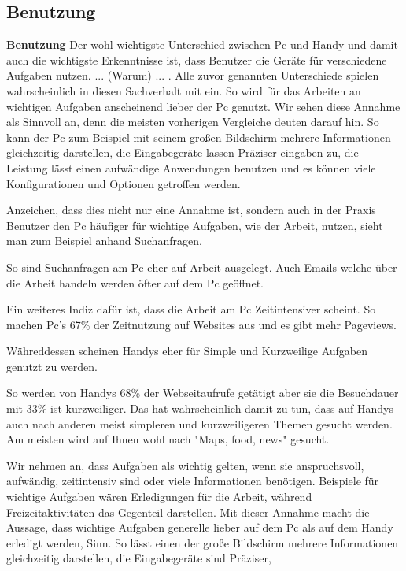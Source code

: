 \subsection{Benutzung}

\myNewSection
\textbf{Benutzung} Der wohl wichtigste Unterschied zwischen Pc und Handy und damit auch die wichtigste Erkenntnisse ist, dass Benutzer die Geräte für verschiedene Aufgaben nutzen. ... (Warum) ... . Alle zuvor genannten Unterschiede spielen wahrscheinlich in diesen Sachverhalt mit ein.%
So wird für das Arbeiten an wichtigen Aufgaben anscheinend lieber der Pc genutzt\cite{pcVsphone_easyUseVsImportantTask}. Wir sehen diese Annahme als Sinnvoll an, denn die meisten vorherigen Vergleiche deuten darauf hin. So kann der Pc zum Beispiel mit seinem großen Bildschirm mehrere Informationen gleichzeitig darstellen, die Eingabegeräte lassen Präziser eingaben zu, die Leistung lässt einen aufwändige Anwendungen benutzen und es können viele Konfigurationen und Optionen getroffen werden. \newline%

Anzeichen, dass dies nicht nur eine Annahme ist, sondern auch in der Praxis Benutzer den Pc häufiger für wichtige Aufgaben, wie der Arbeit, nutzen, sieht man zum Beispiel anhand Suchanfragen. \newline

So sind Suchanfragen am Pc eher auf Arbeit ausgelegt\cite{}. Auch Emails welche über die Arbeit handeln werden öfter auf dem Pc geöffnet\cite{}.

Ein weiteres Indiz dafür ist, dass die Arbeit am Pc Zeitintensiver scheint. So machen Pc's 67\% der Zeitnutzung auf Websites aus und es gibt mehr Pageviews.\newline

Währeddessen scheinen Handys eher für Simple und Kurzweilige Aufgaben genutzt zu werden.

So werden von Handys 68\% der Webseitaufrufe getätigt aber sie die Besuchdauer mit 33\% ist kurzweiliger\cite{}. Das hat wahrscheinlich damit zu tun, dass auf Handys auch nach anderen meist simpleren und kurzweiligeren Themen gesucht werden. Am meisten wird auf Ihnen wohl nach "Maps, food, news" gesucht.  









Wir nehmen an, dass Aufgaben als wichtig gelten, wenn sie anspruchsvoll, aufwändig, zeitintensiv sind oder viele Informationen benötigen. Beispiele für wichtige Aufgaben wären Erledigungen für die Arbeit, während Freizeitaktivitäten das Gegenteil darstellen.\newline%
Mit dieser Annahme macht die Aussage, dass wichtige Aufgaben generelle lieber auf dem Pc als auf dem Handy erledigt werden, Sinn. So lässt einen der große Bildschirm mehrere Informationen gleichzeitig darstellen, die Eingabegeräte sind Präziser, 



